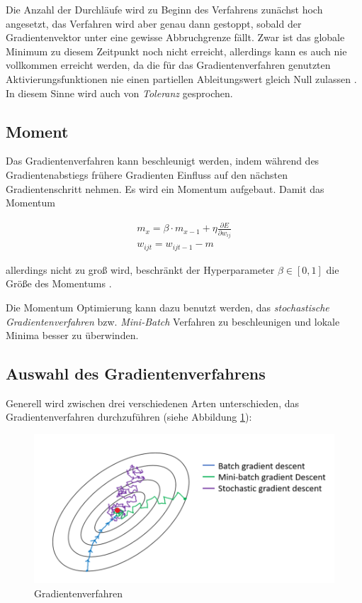 Die Anzahl der Durchläufe wird zu Beginn des Verfahrens zunächst hoch angesetzt, das Verfahren wird aber genau dann gestoppt, sobald der Gradientenvektor unter eine gewisse Abbruchgrenze fällt. Zwar ist das globale Minimum zu diesem Zeitpunkt noch nicht erreicht, allerdings kann es auch nie vollkommen erreicht werden, da die für das Gradientenverfahren genutzten Aktivierungsfunktionen nie einen partiellen Ableitungswert gleich Null zulassen \cite{AurelienGeron.2018}. In diesem Sinne wird auch von \textit{Toleranz} gesprochen.

\subsection*{Moment}

Das Gradientenverfahren kann beschleunigt werden, indem während des Gradientenabstiegs frühere Gradienten Einfluss auf den nächsten Gradientenschritt nehmen. Es wird ein \glqq Momentum\grqq{} aufgebaut. Damit das Momentum 

\begin{equation} \label{momentum}
\begin{split}
m_x = \beta \cdot m_{x-1} + \eta\frac{\partial E}{\partial w_{ij}} \\
w_{ijt} = w_{ijt-1} - m 
\end{split}
\end{equation}

allerdings nicht zu groß wird, beschränkt der Hyperparameter $\beta \in [0,1]$ die Größe des Momentums \cite{AurelienGeron.2018}.

Die Momentum Optimierung kann dazu benutzt werden, das \textit{stochastische Gradientenverfahren} bzw. \textit{Mini-Batch} Verfahren zu beschleunigen und lokale Minima besser zu überwinden.

\subsection*{Auswahl des Gradientenverfahrens}

Generell wird zwischen drei verschiedenen Arten unterschieden, das Gradientenverfahren durchzuführen (siehe Abbildung \ref{gradient}):

\begin{figure}[ht]
	\begin{center}
		\includegraphics[width=15cm]{Bilder/gradient_descent.png} 
		\caption[Gradientenverfahren]{Gradientenverfahren \cite{ImadDabbura.20171221}}
		\label{gradient}
	\end{center}
\end{figure}

